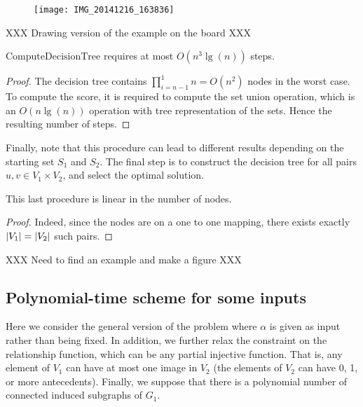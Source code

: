 			\begin{figure}[ht]
				\centering
				\texttt{[image: IMG\_20141216\_163836]}
				\label{fig:foo}
			\end{figure}

			XXX Drawing version of the example on the board XXX

			\begin{proposition}\label{sec:apx-bt}
				$\text{ComputeDecisionTree}$ requires at most $O(n^3\lg(n))$ steps.
			\end{proposition}
			\begin{proof}
				The decision tree contains $\prod_{i=n-1}^{1}{n} = O(n^2)$ nodes in the worst case.
				To compute the score, it is required to compute the set union operation, which is an $O(n\lg(n))$ operation with tree representation of the sets.
				Hence the resulting number of steps.
			\end{proof}

			Finally, note that this procedure can lead to different results depending on the starting set $S_1$ and $S_2$.
			The final step is to construct the decision tree for all pairs $u,v \in V_1\times V_2$, and select the optimal solution.

			\begin{proposition}\label{sec:at-cater-proof}
				This last procedure is linear in the number of nodes.
			\end{proposition}
			\begin{proof}
				Indeed, since the nodes are on a one to one mapping, there exists exactly $\lvert V_1\rvert = \lvert V_2\rvert$ such pairs.
			\end{proof}


			XXX Need to find an example and make a figure XXX
			

		\subsection{Polynomial-time scheme for some inputs}
		\label{subsec:enumerable}

			Here we consider the general version of the \mwccs{} problem where $\alpha$ is given as input rather than being fixed.
			In addition, we further relax the constraint on the relationship function, which can be any partial injective function.
			That is, any element of $V_1$ can have at most one image in $V_2$ (the elements of $V_2$ can have 0, 1, or more antecedents).
			Finally, we suppose that there is a polynomial number of connected induced subgraphs of $G_1$.


